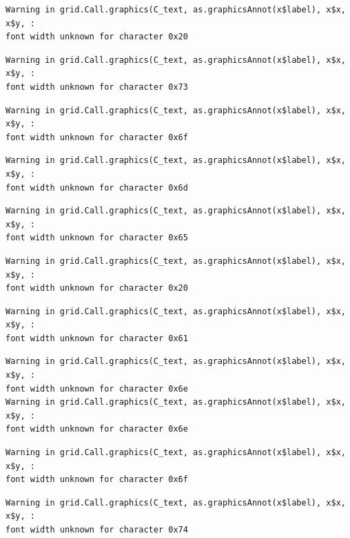\documentclass[
  letterpaper,
]{scrbook}
\begin{document}
\begin{verbatim}
Warning in grid.Call.graphics(C_text, as.graphicsAnnot(x$label), x$x, x$y, :
font width unknown for character 0x20
\end{verbatim}

\begin{verbatim}
Warning in grid.Call.graphics(C_text, as.graphicsAnnot(x$label), x$x, x$y, :
font width unknown for character 0x73
\end{verbatim}

\begin{verbatim}
Warning in grid.Call.graphics(C_text, as.graphicsAnnot(x$label), x$x, x$y, :
font width unknown for character 0x6f
\end{verbatim}

\begin{verbatim}
Warning in grid.Call.graphics(C_text, as.graphicsAnnot(x$label), x$x, x$y, :
font width unknown for character 0x6d
\end{verbatim}

\begin{verbatim}
Warning in grid.Call.graphics(C_text, as.graphicsAnnot(x$label), x$x, x$y, :
font width unknown for character 0x65
\end{verbatim}

\begin{verbatim}
Warning in grid.Call.graphics(C_text, as.graphicsAnnot(x$label), x$x, x$y, :
font width unknown for character 0x20
\end{verbatim}

\begin{verbatim}
Warning in grid.Call.graphics(C_text, as.graphicsAnnot(x$label), x$x, x$y, :
font width unknown for character 0x61
\end{verbatim}

\begin{verbatim}
Warning in grid.Call.graphics(C_text, as.graphicsAnnot(x$label), x$x, x$y, :
font width unknown for character 0x6e
Warning in grid.Call.graphics(C_text, as.graphicsAnnot(x$label), x$x, x$y, :
font width unknown for character 0x6e
\end{verbatim}

\begin{verbatim}
Warning in grid.Call.graphics(C_text, as.graphicsAnnot(x$label), x$x, x$y, :
font width unknown for character 0x6f
\end{verbatim}

\begin{verbatim}
Warning in grid.Call.graphics(C_text, as.graphicsAnnot(x$label), x$x, x$y, :
font width unknown for character 0x74
\end{verbatim}
\end{document}
